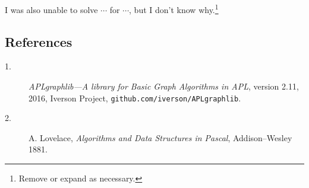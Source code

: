 \documentclass{tufte-handout}
\begin{document}
I was also unable to solve $\cdots$ for $\cdots$, but I don’t know why.\footnote{Remove or expand as necessary.}

\subsection{References}
\begin{description}
  \item[1.] \emph{APLgraphlib---A library for Basic Graph Algorithms in APL}, version 2.11, 2016, Iverson Project, {\tt github.com/iverson/APLgraphlib}.

  \item[2.] A. Lovelace, \emph{Algorithms and Data Structures in Pascal}, Addison--Wesley 1881. 
\end{description}
\end{document}
